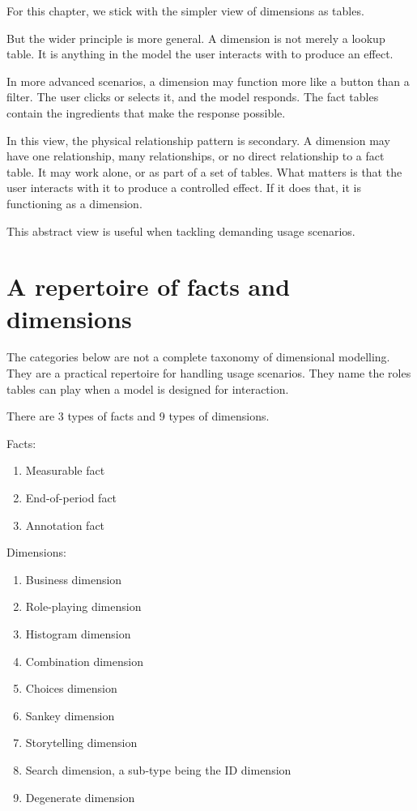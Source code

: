 \documentclass[10pt,openany,10pt]{book}
\providecommand{\tightlist}{%
  \setlength{\itemsep}{0pt}\setlength{\parskip}{0pt}}
\begin{document}
For this chapter, we stick with the simpler view of dimensions as
tables.

But the wider principle is more general. A dimension is not merely a
lookup table. It is anything in the model the user interacts with to
produce an effect.

In more advanced scenarios, a dimension may function more like a button
than a filter. The user clicks or selects it, and the model responds.
The fact tables contain the ingredients that make the response possible.

In this view, the physical relationship pattern is secondary. A
dimension may have one relationship, many relationships, or no direct
relationship to a fact table. It may work alone, or as part of a set of
tables. What matters is that the user interacts with it to produce a
controlled effect. If it does that, it is functioning as a dimension.

This abstract view is useful when tackling demanding usage scenarios.

\section{A repertoire of facts and
dimensions}\label{a-repertoire-of-facts-and-dimensions}

The categories below are not a complete taxonomy of dimensional
modelling. They are a practical repertoire for handling usage scenarios.
They name the roles tables can play when a model is designed for
interaction.

There are 3 types of facts and 9 types of dimensions.

Facts:

\begin{enumerate}
\def\labelenumi{\arabic{enumi}.}
\tightlist
\item
  Measurable fact
\item
  End-of-period fact
\item
  Annotation fact
\end{enumerate}

Dimensions:

\begin{enumerate}
\def\labelenumi{\arabic{enumi}.}
\tightlist
\item
  Business dimension
\item
  Role-playing dimension
\item
  Histogram dimension
\item
  Combination dimension
\item
  Choices dimension
\item
  Sankey dimension
\item
  Storytelling dimension
\item
  Search dimension, a sub-type being the ID dimension
\item
  Degenerate dimension
\end{enumerate}
\end{document}
